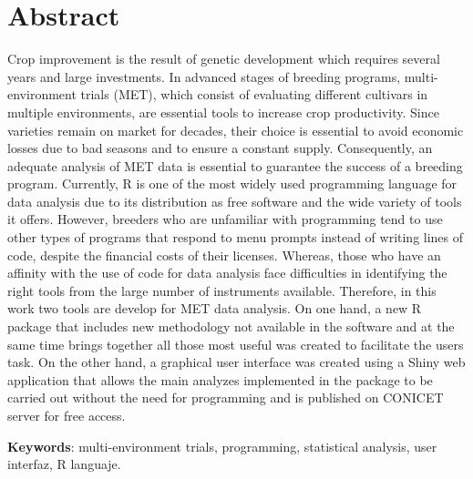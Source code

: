 
\chapter*{Abstract}


Crop improvement is the result of genetic development which requires several years and large investments. In advanced stages of breeding programs, multi-environment trials (MET), which consist of evaluating different cultivars in multiple environments, are essential tools to increase crop productivity. Since varieties remain on market for decades, their choice is essential to avoid economic losses due to bad seasons and to ensure a constant supply. Consequently, an adequate analysis of MET data is essential to guarantee the success of a breeding program. Currently, R is one of the most widely used programming language for data analysis due to its distribution as free software and the wide variety of tools it offers. However, breeders who are unfamiliar with programming tend to use other types of programs that respond to menu prompts instead of writing lines of code, despite the financial costs of their licenses. Whereas, those who have an affinity with the use of code for data analysis face difficulties in identifying the right tools from the large number of instruments available. Therefore, in this work two tools are develop for MET data analysis. On one hand, a new R package that includes new methodology not available in the software and at the same time brings together all those most useful  was created to facilitate the users task. On the other hand, a graphical user interface was created using a Shiny web application that allows the main analyzes implemented in the package to be carried out without the need for programming and is published on CONICET server for free access. 

\textbf{Keywords}: multi-environment trials, programming, statistical analysis, user interfaz, R languaje.

